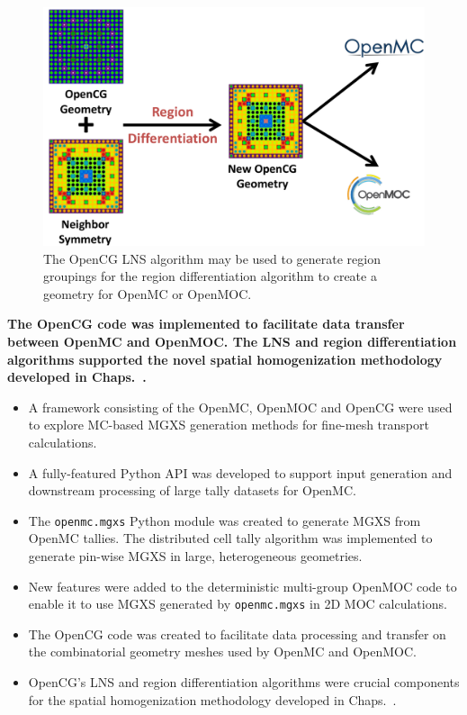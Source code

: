 \begin{figure}[h!]
  \centering
  \includegraphics[width=0.8\linewidth]{figures/workflow/opencg/region-diff-proc-diagram}
  \caption[OpenCG region differentiation process diagram]{The OpenCG \ac{LNS} algorithm may be used to generate region groupings for the region differentiation algorithm to create a geometry for OpenMC or OpenMOC.}
  \label{fig:region-diff-proc-diagram}
\end{figure}

\begin{emphbox}
\textbf{The OpenCG code was implemented to facilitate data transfer between OpenMC and OpenMOC. The \ac{LNS} and region differentiation algorithms supported the novel spatial homogenization methodology developed in Chaps.~.}
\end{emphbox}


\vfill
\begin{highlightsbox}[frametitle=Highlights]
\begin{itemize}
  \item A framework consisting of the OpenMC, OpenMOC and OpenCG were used to explore \ac{MC}-based \ac{MGXS} generation methods for fine-mesh transport calculations.
  \item A fully-featured Python \ac{API} was developed to support input generation and downstream processing of large tally datasets for OpenMC.
  \item The \texttt{openmc.mgxs} Python module was created to generate \ac{MGXS} from OpenMC tallies. The distributed cell tally algorithm was implemented to generate pin-wise \ac{MGXS} in large, heterogeneous geometries.
  \item New features were added to the deterministic multi-group OpenMOC code to enable it to use \ac{MGXS} generated by \texttt{openmc.mgxs} in 2D \ac{MOC} calculations.
  \item The OpenCG code was created to facilitate data processing and transfer on the combinatorial geometry meshes used by OpenMC and OpenMOC.
  \item OpenCG's \ac{LNS} and region differentiation algorithms were crucial components for the spatial homogenization methodology developed in Chaps.~.  
\end{itemize}
\end{highlightsbox}
\vfill